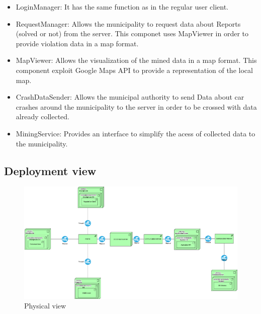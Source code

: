\begin{itemize}
	\item LoginManager: It has the same function as in the regular user client.
	\item RequestManager: Allows the municipality to request data about Reports (solved or not) from the server. This componet uses MapViewer in order to provide violation data in a map format.
	\item MapViewer: Allows the visualization of the mined data in a map format. This component exploit Google Maps API to provide a representation of the local map.
	\item CrashDataSender: Allows the municipal authority to send Data about car crashes around the municipality to the server in order to be crossed with data already collected.
	\item MiningService: Provides an interface to simplify the acess of collected data to the municipality.
\end{itemize}

\newpage
\subsection{Deployment view}

\begin{figure}[h!]
	\centering
	\includegraphics[width=\textwidth]{Images/physical_view}
	\caption{Physical view}
\end{figure}

